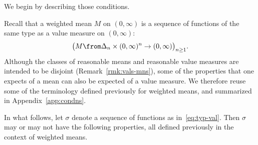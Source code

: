 We begin by describing those conditions.  

Recall that a weighted mean $M$ on $(0, \infty)$ is a sequence of functions
of the same type as a value measure on $(0, \infty)$:
\[
\bigl( 
M \from \Delta_n \times (0, \infty)^n \to (0, \infty) 
\bigr)_{n \geq 1}.
\]
Although the classes of reasonable means and reasonable value measures
are intended to be disjoint (Remark~\ref{rmk:vals-mns}), some of the
properties that one expects of a mean can also be expected of a value
measure.  We therefore reuse some of the terminology defined previously
for weighted means, and summarized in Appendix~\ref{app:condns}.  

In what follows, let $\sigma$ denote a sequence of
functions as in~\eqref{eq:typ-val}.
Then $\sigma$ may or may not have the following properties, all defined
previously in the context of weighted means.

